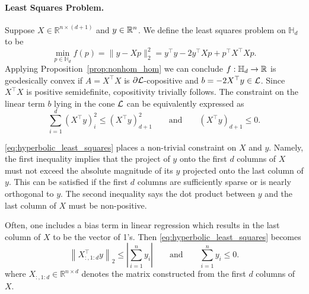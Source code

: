 \documentclass[twoside,11pt]{article}
\begin{document}
\paragraph{Least Squares Problem.}
Suppose $X \in \mathbb{R}^{n \times (d+1)}$ and $y \in \mathbb{R}^{n}$. We define the least squares problem on $\mathbb{H}_d$ to be 
\[
\min_{p \in \mathbb{H}_d}f(p) = \|y - Xp\|_2^2 = y^\top y - 2y^\top X p + p^\top X^\top X p.
\]
Applying Proposition~\ref{prop:nonhom_hom} we can conclude $f:\mathbb{H}_d \to \mathbb{R}$ is geodesically convex if $A = X^\top X$ is $\partial \mathcal{L}$-copositive and $b=-2X^\top y \in \mathcal{L}$. Since $X^\top X$ is positive semidefinite, copositivity trivially follows. The constraint on the linear term $b$ lying in the cone $\mathcal{L}$ can be equivalently expressed as 
\begin{equation}\label{eq:hyperbolic_least_squares}
    \sum_{i=1}^d \left(X^\top y\right)_i^2 \leq \left(X^\top y\right)_{d+1}^2 \qquad \text{and} \qquad \left(X^\top y\right)_{d+1} \leq 0.
\end{equation}

\eqref{eq:hyperbolic_least_squares} places a non-trivial constraint on $X$ and $y$. Namely, the first inequality implies that the project of $y$ onto the first $d$ columns of $X$ must not exceed the absolute magnitude of its $y$ projected onto the last column of $y.$ This can be satisfied if the first $d$ columns are sufficiently sparse or is nearly orthogonal to $y$. The second inequality says the dot product between $y$ and the last column of $X$ must be non-positive.

Often, one includes a bias term in linear regression which results in the last column of $X$ to be the vector of 1's. Then \eqref{eq:hyperbolic_least_squares} becomes 
\begin{equation}
     \left \|X_{:, 1:d}^\top y \right \|_2 \leq \left | \sum_{i=1}^n y_i \right | \qquad \text{and} \qquad \sum_{i=1}^n y_i \leq 0.
\end{equation}
where $X_{:, 1:d} \in \mathbb{R}^{n \times d}$ denotes the matrix constructed from the first $d$ columns of $X$.







\end{document}
